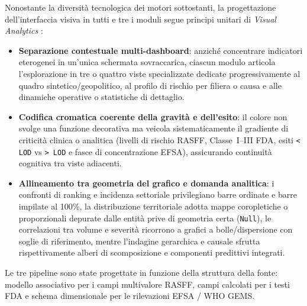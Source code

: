 Nonostante la diversità tecnologica dei motori sottostanti, la progettazione dell'interfaccia visiva in tutti e tre i moduli segue principi unitari di \textit{Visual Analytics} \citep{few2013}:
\begin{itemize}
    \item \textbf{Separazione contestuale multi-dashboard}: anziché concentrare indicatori eterogenei in un'unica schermata sovraccarica, ciascun modulo articola l'esplorazione in tre o quattro viste specializzate dedicate progressivamente al quadro sintetico/geopolitico, al profilo di rischio per filiera o causa e alle dinamiche operative o statistiche di dettaglio.
    \item \textbf{Codifica cromatica coerente della gravità e dell'esito}: il colore non svolge una funzione decorativa ma veicola sistematicamente il gradiente di criticità clinica o analitica (livelli di rischio RASFF, Classe~I--III FDA, esiti \texttt{\textless{} LOD} vs \texttt{\textgreater{} LOD} e fasce di concentrazione EFSA), assicurando continuità cognitiva tra viste adiacenti.
    \item \textbf{Allineamento tra geometria del grafico e domanda analitica}: i confronti di ranking e incidenza settoriale privilegiano barre ordinate e barre impilate al 100\%, la distribuzione territoriale adotta mappe coropletiche o proporzionali depurate dalle entità prive di geometria certa (\texttt{Null}), le correlazioni tra volume e severità ricorrono a grafici a bolle/dispersione con soglie di riferimento, mentre l'indagine gerarchica e causale sfrutta rispettivamente alberi di scomposizione e componenti predittivi integrati.
\end{itemize}

\noindent
Le tre pipeline sono state progettate in funzione della struttura della fonte: modello associativo per i campi multivalore RASFF, campi calcolati per i testi FDA e schema dimensionale per le rilevazioni EFSA / WHO GEMS.
